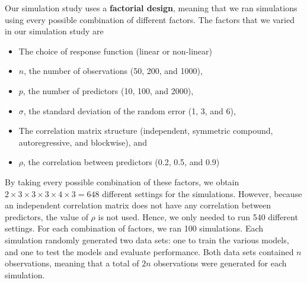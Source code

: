 \documentclass{article}
\begin{document}

	
	Our simulation study uses a \textbf{factorial design}, meaning that we ran simulations using every possible combination of different factors. The factors that we varied in our simulation study are
	\begin{itemize}\itemsep0pt
		\item The choice of response function (linear or non-linear)
		\item $n$, the number of observations (50, 200, and 1000),
		\item $p$, the number of predictors (10, 100, and 2000),
		\item $\sigma$, the standard deviation of the random error (1, 3, and 6),
		\item The correlation matrix structure (independent, symmetric compound, autoregressive, and blockwise), and
		\item $\rho$, the correlation between predictors (0.2, 0.5, and 0.9)
	\end{itemize}
	
	By taking every possible combination of these factors, we obtain $2\times 3\times 3\times 3\times 4\times 3 = 648$ different settings for the simulations. However, because an independent correlation matrix does not have any correlation between predictors, the value of $\rho$ is not used. Hence, we only needed to run 540 different settings. For each combination of factors, we ran 100 simulations. Each simulation randomly generated two data sets: one to train the various models, and one to test the models and evaluate performance. Both data sets contained $n$ observations, meaning that a total of $2n$ observations were generated for each simulation.
	
\end{document}
